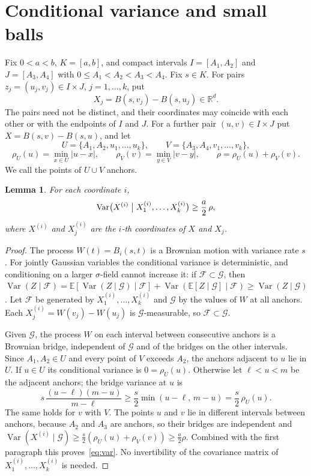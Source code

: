 \documentclass[11pt]{amsart}
\newtheorem{lemma}[theorem]{Lemma}
\theoremstyle{remark}
\newcommand{\R}{\mathbb{R}}
\newcommand{\E}{\mathbb{E}}
\newcommand{\Var}{\operatorname{Var}}
\begin{document}
\section{Conditional variance and small balls}\label{sec:var}

Fix $0<a<b$, $K=[a,b]$, and compact intervals $I=[A_1,A_2]$ and $J=[A_3,A_4]$ with $0\le A_1<A_2<A_3<A_4$. Fix $s\in K$.
For pairs $z_j=(u_j,v_j)\in I\times J$, $j=1,\dots,k$, put
\[
X_j=B(s,v_j)-B(s,u_j)\in\R^d.
\]
The pairs need not be distinct, and their coordinates may coincide with each other or with the endpoints of $I$ and
$J$. For a further pair $(u,v)\in I\times J$ put $X=B(s,v)-B(s,u)$, and let
\[
U=\{A_1,A_2,u_1,\dots,u_k\},\qquad V=\{A_3,A_4,v_1,\dots,v_k\},
\]
\[
\rho_U(u)=\min_{x\in U}|u-x|,\qquad \rho_V(v)=\min_{y\in V}|v-y|,\qquad \rho=\rho_U(u)+\rho_V(v).
\]
We call the points of $U\cup V$ anchors.

\begin{lemma}\label{lem:var}
For each coordinate $i$,
\begin{equation}\label{eq:var}
\Var\bigl(X^{(i)}\bigm| X^{(i)}_1,\dots,X^{(i)}_k\bigr)\ge\frac a2\,\rho,
\end{equation}
where $X^{(i)}$ and $X^{(i)}_j$ are the $i$-th coordinates of $X$ and $X_j$.
\end{lemma}

\begin{proof}
The process $W(t)=B_i(s,t)$ is a Brownian motion with variance rate $s$. For jointly Gaussian variables the conditional
variance is deterministic, and conditioning on a larger $\sigma$-field cannot increase it: if
$\mathcal F\subset\mathcal G$, then $\Var(Z\mid\mathcal F)=\E[\Var(Z\mid\mathcal G)\mid\mathcal F]+\Var(\E[Z\mid\mathcal
G]\mid\mathcal F)\ge\Var(Z\mid\mathcal G)$. Let $\mathcal F$ be generated by $X^{(i)}_1,\dots,X^{(i)}_k$ and $\mathcal G$
by the values of $W$ at all anchors. Each $X^{(i)}_j=W(v_j)-W(u_j)$ is $\mathcal G$-measurable, so $\mathcal F\subset\mathcal
G$.

Given $\mathcal G$, the process $W$ on each interval between consecutive anchors is a Brownian bridge, independent of
$\mathcal G$ and of the bridges on the other intervals. Since $A_1,A_2\in U$ and every point of $V$ exceeds $A_2$, the
anchors adjacent to $u$ lie in $U$. If $u\in U$ its conditional variance is $0=\rho_U(u)$. Otherwise let $\ell<u<m$ be
the adjacent anchors; the bridge variance at $u$ is
\[
s\,\frac{(u-\ell)(m-u)}{m-\ell}\ge\frac s2\min(u-\ell,\,m-u)=\frac s2\,\rho_U(u).
\]
The same holds for $v$ with $V$. The points $u$ and $v$ lie in different intervals between anchors, because $A_2$ and
$A_3$ are anchors, so their bridges are independent and
$\Var(X^{(i)}\mid\mathcal G)\ge\frac s2(\rho_U(u)+\rho_V(v))\ge\frac a2\rho$. Combined with the first paragraph this
proves~\eqref{eq:var}. No invertibility of the covariance matrix of $X^{(i)}_1,\dots,X^{(i)}_k$ is needed.
\end{proof}
\end{document}
